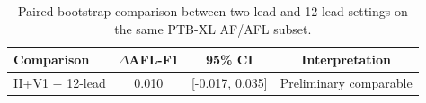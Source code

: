 \begin{table}[t]
\centering
\caption{Paired bootstrap comparison between two-lead and 12-lead settings on the same PTB-XL AF/AFL subset.}
\label{tab:ptbxl_lead_bootstrap}
\begin{tabular}{lccc}
\toprule
Comparison & $\Delta$AFL-F1 & 95\% CI & Interpretation \\
\midrule
II+V1 $-$ 12-lead & 0.010 & [-0.017, 0.035] & Preliminary comparable \\
\bottomrule
\end{tabular}
\end{table}

